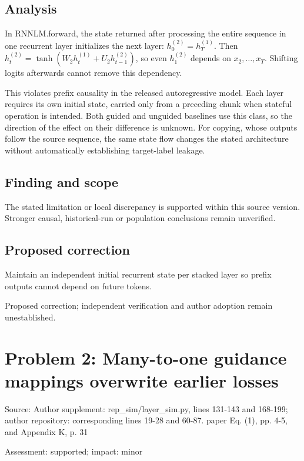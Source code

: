 \documentclass[11pt]{article}
\begin{document}
\subsection*{Analysis}

In RNNLM.forward, the state returned after processing the entire sequence in one recurrent layer initializes the next layer: \(h_0^{(2)}=h_T^{(1)}\). Then \(h_t^{(2)}=\tanh(W_2h_t^{(1)}+U_2h_{t-1}^{(2)})\), so even \(h_1^{(2)}\) depends on \(x_2,\ldots,x_T\). Shifting logits afterwards cannot remove this dependency.

This violates prefix causality in the released autoregressive model. Each layer requires its own initial state, carried only from a preceding chunk when stateful operation is intended. Both guided and unguided baselines use this class, so the direction of the effect on their difference is unknown. For copying, whose outputs follow the source sequence, the same state flow changes the stated architecture without automatically establishing target-label leakage.

\subsection*{Finding and scope}

The stated limitation or local discrepancy is supported within this source version. Stronger causal, historical-run or population conclusions remain unverified.

\subsection*{Proposed correction}

Maintain an independent initial recurrent state per stacked layer so prefix outputs cannot depend on future tokens.

Proposed correction; independent verification and author adoption remain unestablished.

\section*{Problem 2: Many-to-one guidance mappings overwrite earlier losses}

Source: Author supplement: rep\_sim/layer\_sim.py, lines 131-143 and 168-199; author repository: corresponding lines 19-28 and 60-87. paper Eq. (1), pp. 4-5, and Appendix K, p. 31

Assessment: supported; impact: minor
\end{document}
